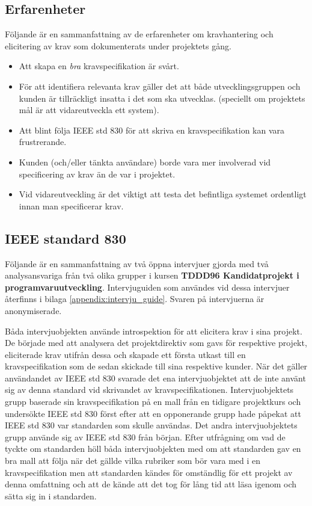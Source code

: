 \subsection{Erfarenheter}
\label{sec:expreience-jannering}
Följande är en sammanfattning av de erfarenheter om kravhantering och elicitering av krav som dokumenterats under projektets gång.
\begin{itemize}
	\item Att skapa en \textit{bra} kravspecifikation är svårt.
	\item För att identifiera relevanta krav gäller det att både utvecklingsgruppen och kunden är tillräckligt insatta i det som ska utvecklas. (speciellt om projektets mål är att vidareutveckla ett system).
	\item Att blint följa IEEE std 830 för att skriva en kravspecifikation kan vara frustrerande.
	\item Kunden (och/eller tänkta användare) borde vara mer involverad vid specificering av krav än de var i projektet.
	\item Vid vidareutveckling är det viktigt att testa det befintliga systemet ordentligt innan man specificerar krav.
\end{itemize}

\subsection{IEEE standard 830}
Följande är en sammanfattning av två öppna intervjuer gjorda med två analysansvariga från två olika grupper i kursen \textbf{TDDD96 	Kandidatprojekt i programvaruutveckling}. Intervjuguiden som användes vid dessa intervjuer återfinns i bilaga \ref{appendix:intervju_guide}. Svaren på intervjuerna är anonymiserade.  

Båda intervjuobjekten använde introspektion för att elicitera krav i sina projekt. De började med att analysera det projektdirektiv som gavs för respektive projekt, eliciterade krav utifrån dessa och skapade ett första utkast till en kravspecifikation som de sedan skickade till sina respektive kunder. När det gäller användandet av IEEE std 830 svarade det ena intervjuobjektet att de inte använt sig av denna standard vid skrivandet av kravspecifikationen. Intervjuobjektets grupp baserade sin kravspecifikation på en mall från en tidigare projektkurs och undersökte IEEE std 830 först efter att en opponerande grupp hade påpekat att IEEE std 830 var standarden som skulle användas. Det andra intervjuobjektets grupp använde sig av IEEE std 830 från början. Efter utfrågning om vad de tyckte om standarden höll båda intervjuobjekten med om att standarden gav en bra mall att följa när det gällde vilka rubriker som bör vara med i en kravspecifikation men att standarden kändes för omständlig för ett projekt av denna omfattning och att de kände att det tog för lång tid att läsa igenom och sätta sig in i standarden.          

